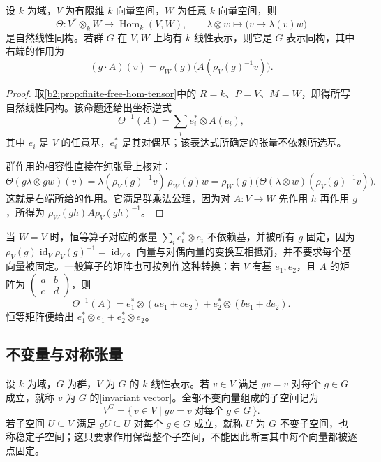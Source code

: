 \begin{proposition}\label{b2:prop:hom-as-tensor-representation}
	设 \(k\) 为域，\(V\) 为有限维 \(k\) 向量空间，\(W\) 为任意 \(k\) 向量空间，则
	\[
		\Theta:V^*\otimes_kW\longrightarrow\operatorname{Hom}_k(V,W), \qquad \lambda\otimes w\longmapsto\bigl(v\mapsto\lambda(v)w\bigr)
	\]
	是自然线性同构。若群 \(G\) 在 \(V,W\) 上均有 \(k\) 线性表示，则它是 \(G\) 表示同构，其中右端的作用为
	\[
		(g\cdot A)(v)=\rho_W(g)\bigl(A(\rho_V(g)^{-1}v)\bigr).
	\]
\end{proposition}
\begin{proof}
	取\cref{b2:prop:finite-free-hom-tensor}中的 \(R=k\)、\(P=V\)、\(M=W\)，即得所写自然线性同构。该命题还给出坐标逆式
	\[
		\Theta^{-1}(A)=\sum_i e_i^*\otimes A(e_i),
	\]
	其中 \(e_i\) 是 \(V\) 的任意基，\(e_i^*\) 是其对偶基；该表达式所确定的张量不依赖所选基。

	群作用的相容性直接在纯张量上核对：
	\[
		\Theta(g\lambda\otimes gw)(v) =\lambda(\rho_V(g)^{-1}v)\,\rho_W(g)w =\rho_W(g)\bigl(\Theta(\lambda\otimes w)(\rho_V(g)^{-1}v)\bigr).
	\]
	这就是右端所给的作用。它满足群乘法公理，因为对 \(A:V\to W\) 先作用 \(h\) 再作用 \(g\)，所得为 \(\rho_W(gh)A\rho_V(gh)^{-1}\)。
\end{proof}

当 \(W=V\) 时，恒等算子对应的张量 \(\sum_i e_i^*\otimes e_i\) 不依赖基，并被所有 \(g\) 固定，因为 \(\rho_V(g)\operatorname{id}_V\rho_V(g)^{-1}=\operatorname{id}_V\)。向量与对偶向量的变换互相抵消，并不要求每个基向量被固定。一般算子的矩阵也可按列作这种转换：若 \(V\) 有基 \(e_1,e_2\)，且 \(A\) 的矩阵为 \(\begin{pmatrix}a&b\\c&d\end{pmatrix}\)，则
\[
	\Theta^{-1}(A) =e_1^*\otimes(ae_1+ce_2)+e_2^*\otimes(be_1+de_2).
\]
恒等矩阵便给出 \(e_1^*\otimes e_1+e_2^*\otimes e_2\)。

\subsection{不变量与对称张量}
\label{b2:subsec:0804:02}

\begin{definition}\label{b2:def:invariant-vector}
	设 \(k\) 为域，\(G\) 为群，\(V\) 为 \(G\) 的 \(k\) 线性表示。若 \(v\in V\) 满足 \(gv=v\) 对每个 \(g\in G\) 成立，就称 \(v\) 为 \(G\) 的[invariant vector]。全部不变向量组成的子空间记为
	\[
		V^G=\{\,v\in V\mid gv=v\;\text{对每个}\;g\in G\,\}.
	\]
	若子空间 \(U\subseteq V\) 满足 \(gU\subseteq U\) 对每个 \(g\in G\) 成立，就称 \(U\) 为 \(G\) 不变子空间，也称稳定子空间；这只要求作用保留整个子空间，不能因此断言其中每个向量都被逐点固定。
\end{definition}


